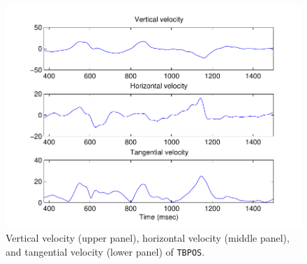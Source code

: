 \documentclass[a4paper, 12pt]{article}
\begin{document}
\setlength\intextsep{-10pt}
\begin{figure}
\includegraphics[scale=0.45]{velms.pdf}%
\caption{Vertical velocity (upper panel), horizontal velocity (middle panel), and tangential velocity (lower panel) of \texttt{TBPOS}.}\label{fig:velms}
\end{figure}
\end{document}
